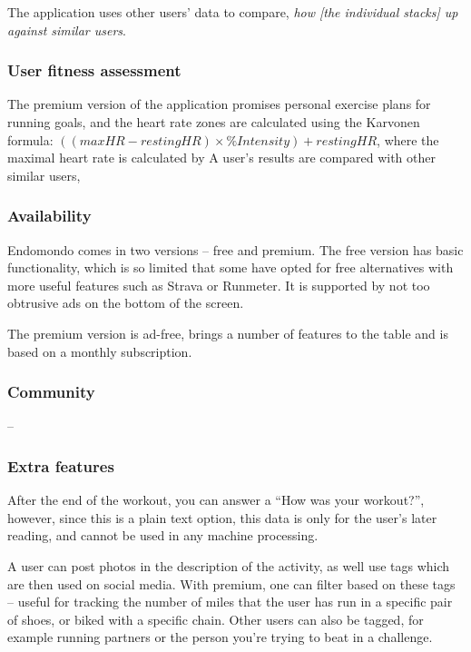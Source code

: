 The application uses other users' data to compare, \textit{how [the individual stacks] up against similar users}.\cite{endomondo-premium-features} 
\subsubsection*{User fitness assessment}
The premium version of the application promises personal exercise plans for running goals, and the heart rate zones are calculated using the Karvonen formula: $((max HR − resting HR) × \% Intensity) + resting HR$, where the maximal heart rate is calculated by 
A user's results are compared with other similar users, 
\subsubsection*{Availability}
Endomondo comes in two versions -- free and premium.
The free version has basic functionality, which is so limited that some have opted for free alternatives with more useful features such as Strava or Runmeter.\cite{endomondo-review}
It is supported by not too obtrusive ads on the bottom of the screen.

The premium version is ad-free, brings a number of features to the table and is based on a monthly subscription.

\subsubsection*{Community} -- 
\subsubsection*{Extra features}
After the end of the workout, you can answer a ``How was your workout?'', however, since this is a plain text option, this data is only for the user's later reading, and cannot be used in any machine processing.

A user can post photos in the description of the activity, as well use tags which are then used on social media.
With premium, one can filter based on these tags -- useful for tracking the number of miles that the user has run in a specific pair of shoes, or biked with a specific chain.
Other users can also be tagged, for example running partners or the person you're trying to beat in a challenge.

